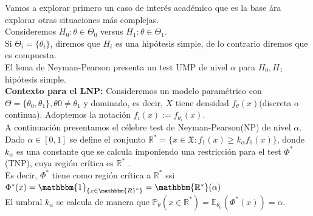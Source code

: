 \documentclass[10pt]{article}
\theoremstyle{plain}
\theoremstyle{definition}
\begin{document}
Vamos a explorar primero un caso de interés académico que es la base ára explorar otras situaciones más complejas.\\
Consideremos $H_{0}: \theta \in \Theta_{0}$ versus $H_{1}: \theta \in \Theta_{1}$.\\

Si $\Theta_{i} = \{\theta_{i}\}$, diremos que $H_{i}$ es una hipótesis simple, de lo contrario diremos que es compuesta.\\

El lema de Neyman-Pearson presenta un test UMP de nivel $\alpha$ para $H_{0},H_{1}$ hipótesis simple.\\

\textbf{Contexto para el LNP:} Consideremos un modelo paramétrico con $\Theta = \{\theta_{0}, \theta_{1}\}, \theta{0}\not =\theta_{1}$ y dominado, es decir, $X$ tiene densidad $f_{\theta}(x)$(discreta o continua). Adoptemos la notación $f_{i}(x) := f_{\theta_{i}}(x)$.\\
A continuación presentamos el célebre test de Neyman-Pearson(NP) de nivel $\alpha$.\\

Dado $\alpha \in [0,1]$ se define el conjunto $\mathbb{R}^* = \{x\in\mathfrak{X}\colon f_{1}(x) \ge k_{\alpha}f_{0}(x)\}$, donde $k_{\alpha}$ es una constante que se calcula imponiendo una restricción para el test $\Phi^*$(TNP), cuya región crítica es $\mathbb{R}^*$ .\\

Es decir, $\Phi^*$ tiene como región crítica a $\mathbb{R}^*$ ssi $\Phi^*(x)=\mathbbm{1}_{\{x\in \mathbbm{R}^*\}} = \mathbbm{\mathbb{R}^*}(\alpha)$\\

El umbral $k_{\alpha}$ se calcula de manera que $\mathbb{P}_{\theta}(x\in\mathbb{R}^*) = \mathbb{E}_{\theta_{0}}(\Phi^*(x))=\alpha$.\\
\end{document}
